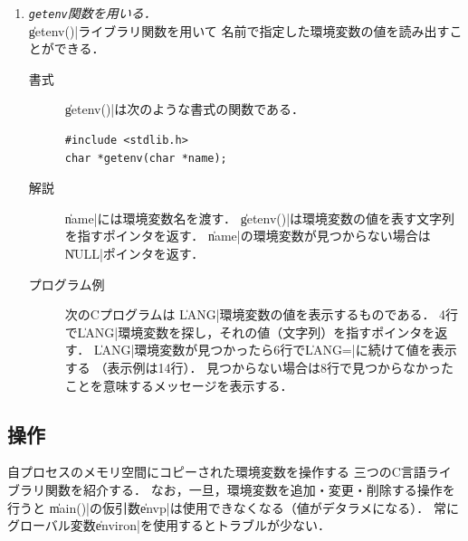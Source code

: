 \begin{enumerate}
\begin{description}
    
  \end{description}

\item \emph{\texttt{getenv}関数を用いる．} \\
  \|getenv()|ライブラリ関数を用いて
  名前で指定した環境変数の値を読み出すことができる．

  \begin{description}
  \item [書式] \|getenv()|は次のような書式の関数である．

\begin{lstlisting}[numbers=none]
#include <stdlib.h>
char *getenv(char *name);
\end{lstlisting}

  \item [解説] \|name|には環境変数名を渡す．
    \|getenv()|は環境変数の値を表す文字列を指すポインタを返す．
    \|name|の環境変数が見つからない場合は\|NULL|ポインタを返す．

  \item [プログラム例]
    次のCプログラムは
    \|LANG|環境変数の値を表示するものである．
    4行で\|LANG|環境変数を探し，それの値（文字列）を指すポインタを返す．
    \|LANG|環境変数が見つかったら6行で\|LANG=|に続けて値を表示する
    （表示例は14行）．
    見つからない場合は8行で見つからなかったことを意味するメッセージを表示する．

    
  \end{description}
\end{enumerate}

\subsection{操作}
自プロセスのメモリ空間にコピーされた環境変数を操作する
三つのC言語ライブラリ関数を紹介する．
なお，一旦，環境変数を追加・変更・削除する操作を行うと
\|main()|の仮引数\|envp|は使用できなくなる（値がデタラメになる）．
常にグローバル変数\|environ|を使用するとトラブルが少ない．

